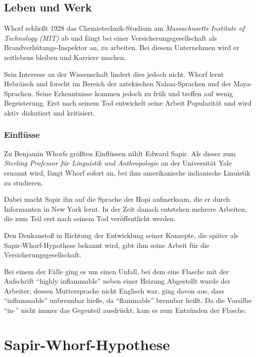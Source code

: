\documentclass[12pt]{scrreprt}
\begin{document}
	\section{Leben und Werk}
	\label{sec:lebenuwerk}
	Whorf schließt 1928 das Chemietechnik-Studium am \textit{Massachusetts Institute of
	Technology (MIT)} ab und fängt bei einer Versicherungsgesellschaft als
	Brandverhütungs-Inspektor an, zu arbeiten. Bei diesem Unternehmen wird er
	zeitlebens bleiben und Karriere machen.

	Sein Interesse an der Wissenschaft lindert dies jedoch nicht. Whorf lernt
	Hebräisch und forscht im Bereich der aztekischen Nahua-Sprachen und der
	Maya-Sprachen. Seine Erkenntnisse kommen jedoch zu früh und treffen auf wenig
	Begeisterung. Erst nach seinem Tod entwickelt seine Arbeit Popularität und
	wird aktiv diskutiert und kritisiert.
		\subsection{Einflüsse}
		\label{sec:einfluesse}
		Zu Benjamin Whorfs größten Einflüssen zählt Edward Sapir. Als dieser zum
		\textit{Sterling Professor für Linguistik und Anthropologie} an der
		Universität Yale ernannt wird, fängt Whorf sofort an, bei ihm amerikanische
		indianische Linuistik zu studieren.

		Dabei macht Sapir ihn auf die Sprache der Hopi aufmerksam, die er durch
		Informanten in New York lernt. In der Zeit danach entstehen mehrere Arbeiten,
		die zum Teil erst nach seinem Tod veröffentlicht werden.

		Den Denkanstoß in Richtung der Entwicklung seiner Konzepte, die später als
		Sapir-Whorf-Hypothese bekannt wird, gibt ihm seine Arbeit für die
		Versicherungsgesellschaft.

		Bei einem der Fälle ging es um einen Unfall, bei dem eine Flasche mit der
		Aufschrift \enquote{highly inflammable} neben einer Heizung Abgestellt wurde
		der Arbeiter, dessen Muttersprache nicht Englisch war, ging davon aus, dass
		\enquote{inflammable} unbrennbar hieße, da \enquote{flammable} brennbar
		heißt. Da die Vorsilbe \enquote{in-} nicht immer das Gegenteil ausdrückt,
		kam es zum Entzünden der Flasche.\autocite{wiki:Benjamin_Lee_Whorf}

\chapter{Sapir-Whorf-Hypothese}
\label{chap:sawo_hypothese}
\end{document}
